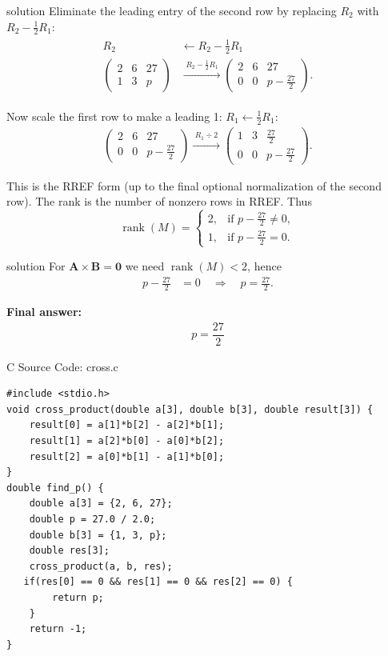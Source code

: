 \documentclass{beamer}
\numberwithin{equation}{section}
\theoremstyle{remark}
\newcommand{\myvec}[1]{\ensuremath{\begin{pmatrix}#1\end{pmatrix}}}
\let\vec\mathbf
\begin{document}
\begin{frame}{solution}
Eliminate the leading entry of the second row by replacing \(R_2\) with \(R_2 - \tfrac{1}{2}R_1\):
\begin{align}
\begin{aligned}
R_2 &\leftarrow R_2 - \tfrac{1}{2}R_1 \\
\myvec{2 & 6 & 27 \\[4pt] 1 & 3 & p }
&\xrightarrow{\;R_2 - \tfrac{1}{2}R_1\;}
\myvec{2 & 6 & 27 \\[4pt] 0 & 0 & p - \tfrac{27}{2} }.
\end{aligned}
\end{align}

Now scale the first row to make a leading 1: \(R_1 \leftarrow \tfrac{1}{2}R_1\):
\begin{align}
\myvec{2 & 6 & 27 \\[4pt] 0 & 0 & p - \tfrac{27}{2} }
\xrightarrow{\;R_1 \div 2\;}
\myvec{1 & 3 & \tfrac{27}{2} \\[4pt] 0 & 0 & p - \tfrac{27}{2} }.
\end{align}

This is the RREF form (up to the final optional normalization of the second row). The rank is the number of nonzero rows in RREF. Thus
\[
\operatorname{rank}(M)=
\begin{cases}
2, & \text{if } p - \tfrac{27}{2} \neq 0,\\[4pt]
1, & \text{if } p - \tfrac{27}{2} = 0.
\end{cases}
\]
\end{frame}
\begin{frame}{solution}
For \(\vec{A}\times\vec{B}=\mathbf0\) we need \(\operatorname{rank}(M)<2\), hence
\begin{align}
p - \tfrac{27}{2} &= 0 \quad\Rightarrow\quad p = \tfrac{27}{2}.
\end{align}

\textbf{Final answer:}
\begin{align}
\boxed{\,p = \dfrac{27}{2}\,}
\end{align}



\end{frame}

\begin{frame}[fragile]{C Source Code: cross.c}
\begin{verbatim}
#include <stdio.h>
void cross_product(double a[3], double b[3], double result[3]) {
    result[0] = a[1]*b[2] - a[2]*b[1];
    result[1] = a[2]*b[0] - a[0]*b[2];
    result[2] = a[0]*b[1] - a[1]*b[0];
}
double find_p() {
    double a[3] = {2, 6, 27};
    double p = 27.0 / 2.0;
    double b[3] = {1, 3, p};
    double res[3];
    cross_product(a, b, res);
   if(res[0] == 0 && res[1] == 0 && res[2] == 0) {
        return p;
    }
    return -1;
}

\end{verbatim}
\end{frame}
\end{document}
